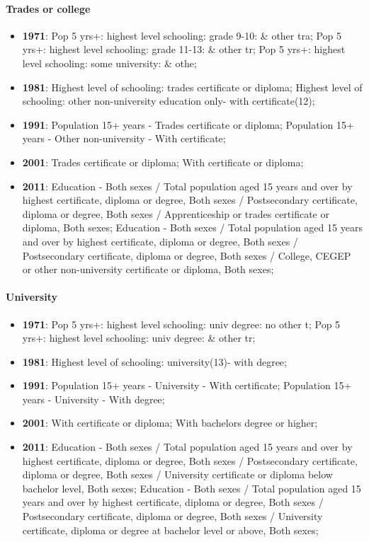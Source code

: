 \documentclass[a4paper]{article}
\begin{document}
\paragraph{Trades or college}
\begin{itemize}
   \item{\textbf{1971}:  Pop 5 yrs+: highest level schooling: grade 9-10: \& other tra; Pop 5 yrs+: highest level schooling: grade 11-13: \& other tr; Pop 5 yrs+: highest level schooling: some university: \& othe;}
   \item{\textbf{1981}:  Highest level of schooling: trades certificate or diploma; Highest level of schooling: other non-university education only- with certificate(12);}
   \item{\textbf{1991}:  Population 15+ years - Trades certificate or diploma; Population 15+ years - Other non-university - With certificate;}
   \item{\textbf{2001}:  Trades certificate or diploma; With certificate or diploma;}
   \item{\textbf{2011}:  Education - Both sexes / Total population aged 15 years and over by highest certificate, diploma or degree, Both sexes / Postsecondary certificate, diploma or degree, Both sexes / Apprenticeship or trades certificate or diploma, Both sexes; Education - Both sexes / Total population aged 15 years and over by highest certificate, diploma or degree, Both sexes / Postsecondary certificate, diploma or degree, Both sexes / College, CEGEP or other non-university certificate or diploma, Both sexes;}
\end{itemize}

\paragraph{University}
\begin{itemize}
   \item{\textbf{1971}:  Pop 5 yrs+: highest level schooling: univ degree: no other t; Pop 5 yrs+: highest level schooling: univ degree: \& other tr;}
   \item{\textbf{1981}:  Highest level of schooling: university(13)- with degree;}
   \item{\textbf{1991}:  Population 15+ years - University - With certificate; Population 15+ years - University - With degree;}
   \item{\textbf{2001}:  With certificate or diploma; With bachelors degree or higher;}
   \item{\textbf{2011}:  Education - Both sexes / Total population aged 15 years and over by highest certificate, diploma or degree, Both sexes / Postsecondary certificate, diploma or degree, Both sexes / University certificate or diploma below bachelor level, Both sexes; 
                         Education - Both sexes / Total population aged 15 years and over by highest certificate, diploma or degree, Both sexes / Postsecondary certificate, diploma or degree, Both sexes / University certificate, diploma or degree at bachelor level or above, Both sexes;}
\end{itemize}
\end{document}

